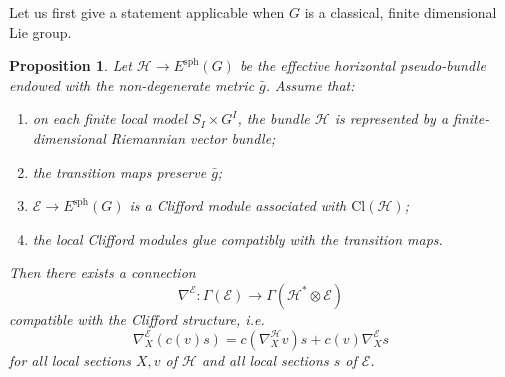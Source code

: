 \documentclass[11pt]{amsart}
\newtheorem{proposition}[theorem]{Proposition}
\begin{document}
Let us first give a statement applicable when $G$ is a classical, finite dimensional Lie group.

\begin{proposition}
Let \(\mathcal H\to E^{\mathrm{sph}}(G)\) be the effective horizontal
pseudo-bundle endowed with the non-degenerate metric \(\bar g\). Assume that:
\begin{enumerate}
\item on each finite local model \(S_I\times G^I\), the bundle
\(\mathcal H\) is represented by a finite-dimensional Riemannian vector bundle;
\item the transition maps preserve \(\bar g\);
\item \(\mathcal E\to E^{\mathrm{sph}}(G)\) is a Clifford module associated
with \(\mathrm{Cl}(\mathcal H)\);
\item the local Clifford modules glue compatibly with the transition maps.
\end{enumerate}
Then there exists a connection
\[
\nabla^{\mathcal E}:\Gamma(\mathcal E)
\longrightarrow
\Gamma(\mathcal H^*\otimes \mathcal E)
\]
compatible with the Clifford structure, i.e.
\[
\nabla^{\mathcal E}_X(c(v)s)
=
c(\nabla^{\mathcal H}_X v)s
+
c(v)\nabla^{\mathcal E}_X s
\]
for all local sections \(X,v\) of \(\mathcal H\) and all local sections
\(s\) of \(\mathcal E\).
\end{proposition}
\end{document}
